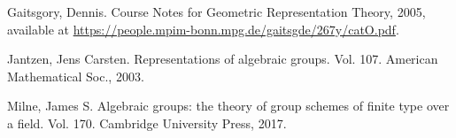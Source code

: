 	

\begin{thebibliography}{Yau}

	 Gaitsgory, Dennis. Course Notes for Geometric Representation Theory, 2005, available at \url{https://people.mpim-bonn.mpg.de/gaitsgde/267y/catO.pdf}.

	 Jantzen, Jens Carsten. Representations of algebraic groups. Vol. 107. American Mathematical Soc., 2003.

	 Milne, James S. Algebraic groups: the theory of group schemes of finite type over a field. Vol. 170. Cambridge University Press, 2017.
\end{thebibliography}


 


